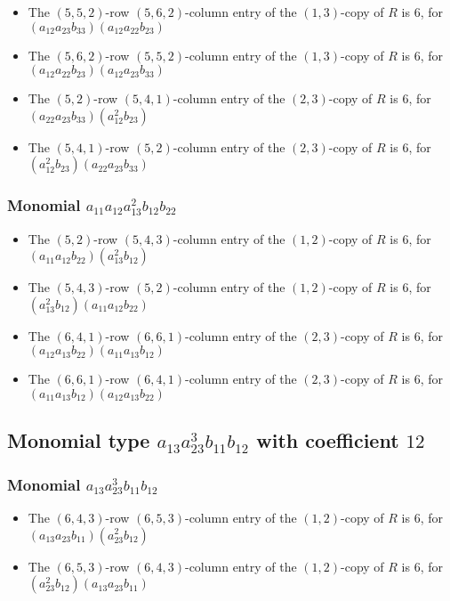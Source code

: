 \documentclass{article}
\begin{document}
\begin{itemize}
\item The $(5, 5, 2)$-row $(5, 6, 2)$-column entry of the $ \left(1, 3\right) $-copy of $R$ is $ 6 $, for $( a_{12} a_{23} b_{33} )( a_{12} a_{22} b_{23} )$ 
\item The $(5, 6, 2)$-row $(5, 5, 2)$-column entry of the $ \left(1, 3\right) $-copy of $R$ is $ 6 $, for $( a_{12} a_{22} b_{23} )( a_{12} a_{23} b_{33} )$ 
\item The $(5, 2)$-row $(5, 4, 1)$-column entry of the $ \left(2, 3\right) $-copy of $R$ is $ 6 $, for $( a_{22} a_{23} b_{33} )( a_{12}^{2} b_{23} )$ 
\item The $(5, 4, 1)$-row $(5, 2)$-column entry of the $ \left(2, 3\right) $-copy of $R$ is $ 6 $, for $( a_{12}^{2} b_{23} )( a_{22} a_{23} b_{33} )$ 
\end{itemize}
\subsubsection{Monomial $ a_{11} a_{12} a_{13}^{2} b_{12} b_{22} $}

\begin{itemize}
\item The $(5, 2)$-row $(5, 4, 3)$-column entry of the $ \left(1, 2\right) $-copy of $R$ is $ 6 $, for $( a_{11} a_{12} b_{22} )( a_{13}^{2} b_{12} )$ 
\item The $(5, 4, 3)$-row $(5, 2)$-column entry of the $ \left(1, 2\right) $-copy of $R$ is $ 6 $, for $( a_{13}^{2} b_{12} )( a_{11} a_{12} b_{22} )$ 
\item The $(6, 4, 1)$-row $(6, 6, 1)$-column entry of the $ \left(2, 3\right) $-copy of $R$ is $ 6 $, for $( a_{12} a_{13} b_{22} )( a_{11} a_{13} b_{12} )$ 
\item The $(6, 6, 1)$-row $(6, 4, 1)$-column entry of the $ \left(2, 3\right) $-copy of $R$ is $ 6 $, for $( a_{11} a_{13} b_{12} )( a_{12} a_{13} b_{22} )$ 
\end{itemize}
\subsection{Monomial type $ a_{13} a_{23}^{3} b_{11} b_{12} $ with coefficient $ 12 $}

\subsubsection{Monomial $ a_{13} a_{23}^{3} b_{11} b_{12} $}

\begin{itemize}
\item The $(6, 4, 3)$-row $(6, 5, 3)$-column entry of the $ \left(1, 2\right) $-copy of $R$ is $ 6 $, for $( a_{13} a_{23} b_{11} )( a_{23}^{2} b_{12} )$ 
\item The $(6, 5, 3)$-row $(6, 4, 3)$-column entry of the $ \left(1, 2\right) $-copy of $R$ is $ 6 $, for $( a_{23}^{2} b_{12} )( a_{13} a_{23} b_{11} )$ 
\end{itemize}
\end{document}
